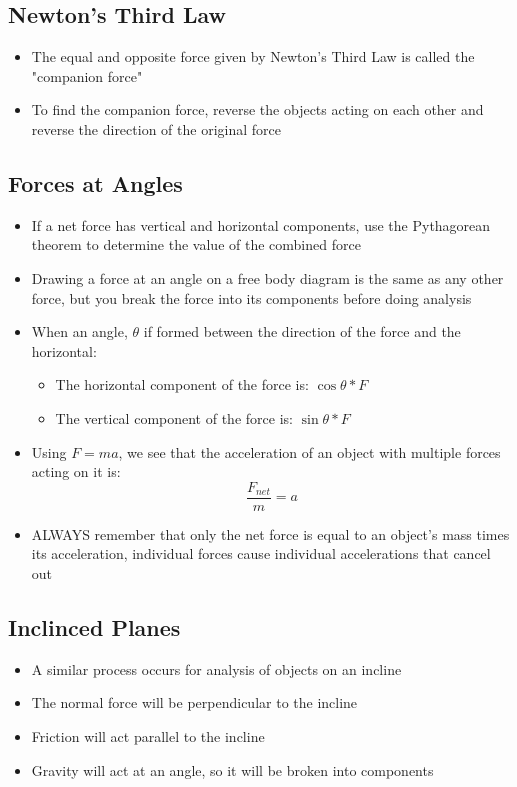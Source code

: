 \subsection{Newton's Third Law}
\begin{itemize}
    \item The equal and opposite force given by Newton's Third Law is called the "companion force"
    \item To find the companion force, reverse the objects acting on each other and reverse the direction of the original force
\end{itemize}

\subsection{Forces at Angles}
\begin{itemize}
    \item If a net force has vertical and horizontal components, use the Pythagorean theorem to determine the value of the combined force
    \item Drawing a force at an angle on a free body diagram is the same as any other force, but you break the force into its components before doing analysis
    \item When an angle, \(\theta\) if formed between the direction of the force and the horizontal:
    \begin{itemize}
        \item The horizontal component of the force is: \(\cos{\theta}*F\)
        \item The vertical component of the force is: \(\sin{\theta}*F\)
    \end{itemize}
    \item Using \(F=ma\), we see that the acceleration of an object with multiple forces acting on it is: \[\frac{F_{net}}{m}=a\]
    \item ALWAYS remember that only the net force is equal to an object's mass times its acceleration, individual forces cause individual accelerations that cancel out
\end{itemize}

\subsection{Inclinced Planes}
\begin{itemize}
    \item A similar process occurs for analysis of objects on an incline
    \item The normal force will be perpendicular to the incline
    \item Friction will act parallel to the incline
    \item Gravity will act at an angle, so it will be broken into components
\end{itemize}

